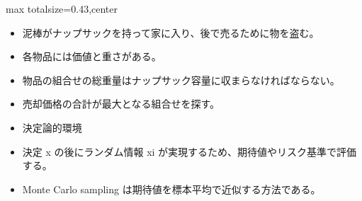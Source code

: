 \clearpage
{}
\begin{minipage}[t]{0.405\textwidth}
\begin{adjustbox}{max totalsize={\textwidth}{0.43\textheight},center}
\begin{minipage}{\textwidth}\scriptsize
{}\begin{itemize}
\item 泥棒がナップサックを持って家に入り、後で売るために物を盗む。
\item 各物品には価値と重さがある。
\item 物品の組合せの総重量はナップサック容量に収まらなければならない。
\item 売却価格の合計が最大となる組合せを探す。
\item 決定論的環境
\end{itemize}\begin{itemize}
\item 決定 x の後にランダム情報 xi が実現するため、期待値やリスク基準で評価する。
\item Monte Carlo sampling は期待値を標本平均で近似する方法である。
\end{itemize}
\end{minipage}
\end{adjustbox}
\end{minipage}\hfill
